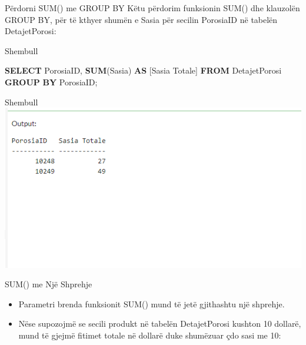 \documentclass[
  ignorenonframetext,
]{beamer}
\newenvironment{Shaded}{\begin{snugshade}}{\end{snugshade}}
\newcommand{\FunctionTok}[1]{\textcolor[rgb]{0.13,0.29,0.53}{\textbf{#1}}}
\newcommand{\KeywordTok}[1]{\textcolor[rgb]{0.13,0.29,0.53}{\textbf{#1}}}
\newcommand{\NormalTok}[1]{#1}
\begin{document}
\begin{frame}{Përdorni SUM() me GROUP BY}
\label{puxebrdorni-sum-me-group-by}
Këtu përdorim funksionin SUM() dhe klauzolën GROUP BY, për të kthyer
shumën e Sasia për secilin PorosiaID në tabelën DetajetPorosi:
\end{frame}

\begin{frame}[fragile]{Shembull}
\label{shembull-41}

\begin{Shaded}
\begin{Highlighting}[]
\KeywordTok{SELECT}\NormalTok{ PorosiaID, }\FunctionTok{SUM}\NormalTok{(Sasia) }\KeywordTok{AS}\NormalTok{ [Sasia Totale]}
\KeywordTok{FROM}\NormalTok{ DetajetPorosi}
\KeywordTok{GROUP} \KeywordTok{BY}\NormalTok{ PorosiaID;}
\end{Highlighting}
\end{Shaded}
\end{frame}

\begin{frame}{Shembull}
\label{shembull-42}
\includegraphics{./Figs/query53.png}
\end{frame}

\begin{frame}{SUM() me Një Shprehje}
\label{sum-me-njuxeb-shprehje}
\begin{itemize}
\item
  Parametri brenda funksionit SUM() mund të jetë gjithashtu një
  shprehje.
\item
  Nëse supozojmë se secili produkt në tabelën DetajetPorosi kushton 10
  dollarë, mund të gjejmë fitimet totale në dollarë duke shumëzuar çdo
  sasi me 10:
\end{itemize}
\end{frame}
\end{document}
